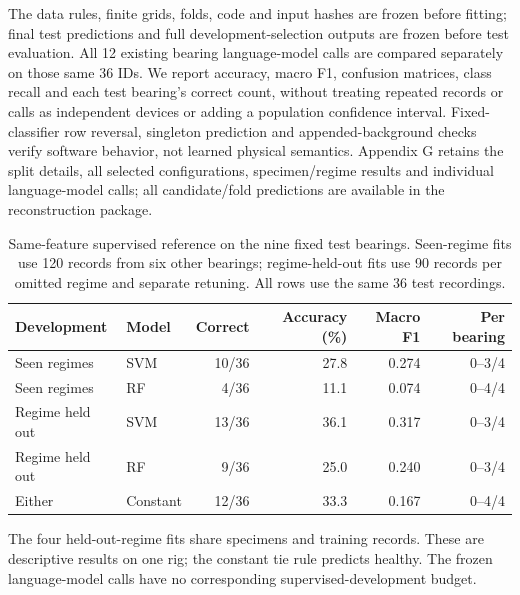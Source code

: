 \documentclass[11pt,a4paper]{article}
\begin{document}
The data rules, finite grids, folds, code and input hashes are frozen before fitting; final test predictions and full development-selection outputs are frozen before test evaluation. All 12 existing bearing language-model calls are compared separately on those same 36 IDs. We report accuracy, macro F1, confusion matrices, class recall and each test bearing's correct count, without treating repeated records or calls as independent devices or adding a population confidence interval. Fixed-classifier row reversal, singleton prediction and appended-background checks verify software behavior, not learned physical semantics. Appendix G retains the split details, all selected configurations, specimen/regime results and individual language-model calls; all candidate/fold predictions are available in the reconstruction package.


\begin{table}[htbp]\centering\small
\caption{Same-feature supervised reference on the nine fixed test bearings. Seen-regime fits use 120 records from six other bearings; regime-held-out fits use 90 records per omitted regime and separate retuning. All rows use the same 36 test recordings.}
\label{tab:supp_bearing_baseline}
\begin{tabular}{@{}llrrrr@{}}\toprule
Development & Model & Correct & Accuracy (\%) & Macro F1 & Per bearing \\\midrule
Seen regimes & SVM & 10/36 & 27.8 & 0.274 & 0--3/4 \\
Seen regimes & RF & 4/36 & 11.1 & 0.074 & 0--4/4 \\
Regime held out & SVM & 13/36 & 36.1 & 0.317 & 0--3/4 \\
Regime held out & RF & 9/36 & 25.0 & 0.240 & 0--3/4 \\
Either & Constant & 12/36 & 33.3 & 0.167 & 0--4/4 \\
\bottomrule\end{tabular}
\par\smallskip\footnotesize The four held-out-regime fits share specimens and training records. These are descriptive results on one rig; the constant tie rule predicts healthy. The frozen language-model calls have no corresponding supervised-development budget.
\end{table}
\end{document}
